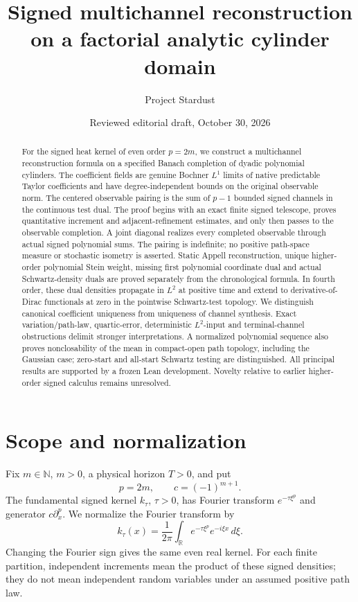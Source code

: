 \documentclass[11pt]{article}
\title{Signed multichannel reconstruction\protect\\
on a factorial analytic cylinder domain}
\author{Project Stardust}
\date{Reviewed editorial draft, October 30, 2026}
\theoremstyle{remark}\newtheorem{remark}[theorem]{Remark}
\newcommand{\R}{\mathbb R}\newcommand{\N}{\mathbb N}
\begin{document}
\maketitle
\begin{abstract}
For the signed heat kernel of even order $p=2m$, we construct a
multichannel reconstruction formula on a specified Banach completion
of dyadic polynomial cylinders. The coefficient fields are genuine
Bochner $L^1$ limits of native predictable Taylor coefficients and
have degree-independent bounds on the original observable norm.
The centered observable pairing is the sum of $p-1$ bounded signed
channels in the continuous test dual. The proof begins with an exact
finite signed telescope, proves quantitative increment and
adjacent-refinement estimates, and only then passes to the observable
completion. A joint diagonal realizes every completed observable
through actual signed polynomial sums. The pairing is indefinite;
no positive path-space measure or stochastic isometry is asserted.
Static Appell reconstruction, unique higher-order polynomial Stein weight,
missing first polynomial coordinate dual and actual Schwartz-density duals
are proved separately from the chronological formula. In fourth order,
these dual densities propagate in $L^2$ at positive time and extend
to derivative-of-Dirac functionals at zero in the pointwise Schwartz-test topology.
We distinguish canonical coefficient uniqueness from uniqueness of channel synthesis. Exact variation/path-law, quartic-error, deterministic $L^2$-input and terminal-channel obstructions delimit stronger interpretations. A normalized
polynomial sequence also proves nonclosability of the mean in compact-open
path topology, including the Gaussian case; zero-start and all-start
Schwartz testing are distinguished. All principal results are supported by a frozen
Lean development. Novelty relative to earlier higher-order signed
calculus remains unresolved.
\end{abstract}

\section{Scope and normalization}
Fix $m\in\N$, $m>0$, a physical horizon $T>0$, and put
\[
 p=2m,\qquad c=(-1)^{m+1}.
\]
The fundamental signed kernel $k_\tau$, $\tau>0$, has Fourier
transform $e^{-\tau\xi^p}$ and generator $c\partial_x^p$.
We normalize the Fourier transform by
\[
 k_\tau(x)=\frac1{2\pi}\int_\R e^{-\tau\xi^p}e^{-i\xi x}\,d\xi.
\]
Changing the Fourier sign gives the same even real kernel.
For each finite partition, independent increments mean the product
of these signed densities; they do not mean independent random
variables under an assumed positive path law.
\end{document}
